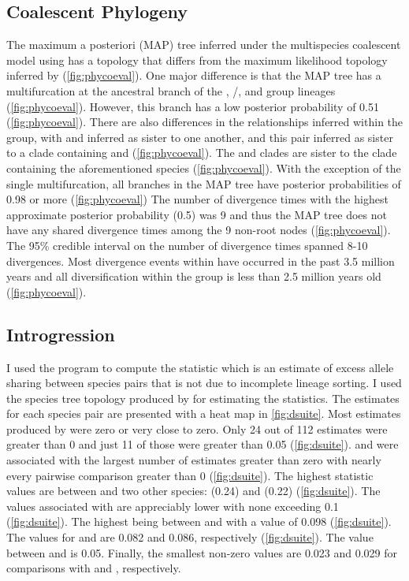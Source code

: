 \subsection{Coalescent Phylogeny}
The maximum a posteriori (MAP) tree inferred under the multispecies coalescent
model using \phycoeval has a topology that differs from the maximum likelihood topology 
inferred by \iqtree (\cref{fig:phycoeval}).
One major difference is that the \phycoeval MAP tree has a multifurcation at the ancestral
branch of the \quercicus, \speciosus/\cognatus, and \amer group lineages (\cref{fig:phycoeval}). 
However, this branch has a low posterior probability of 0.51 (\cref{fig:phycoeval}). 
There are also differences in the relationships inferred within the \amer group,
with \amer and \terr inferred as sister to one another, and this pair inferred as sister 
to a clade containing \wood and \terr (\cref{fig:phycoeval}).  
The \hemiophrys and \baxteri clades are sister to the clade containing the aforementioned
species (\cref{fig:phycoeval}).
With the exception of the single multifurcation, all branches in the MAP tree have 
posterior probabilities of 0.98 or more (\cref{fig:phycoeval})
The number of divergence times with the highest approximate posterior probability
(0.5) was 9 and thus the MAP tree does not have any shared divergence times among the 
9 non-root nodes (\cref{fig:phycoeval}). 
The 95\% credible interval on the number of divergence times spanned 8-10 divergences. 
Most divergence events within \anaxyrus have occurred in the past 3.5 million 
years and all diversification within the \americanus group is less than 2.5   
million years old (\cref{fig:phycoeval}).

\subsection{Introgression}
I used the program \dsuite to compute the \fbranch statistic which is an  
estimate of excess allele sharing between species pairs that is not due to 
incomplete lineage sorting. 
I used the species tree topology produced by \phycoeval for estimating 
the \fbranch statistics. 
The \fbranch estimates for each species pair are presented with a heat map in 
\cref{fig:dsuite}.
Most \fbranch estimates produced by \dsuite were zero or very close to zero.
Only 24 out of 112 \fbranch estimates were greater than 0 and just 11 of those were 
greater than 0.05 (\cref{fig:dsuite}).
\amer and \wood were associated with the largest number of estimates greater than
zero with nearly every pairwise comparison greater than 0
(\cref{fig:dsuite}). 
The highest \fbranch statistic values are between \amer and two other 
species: \hemiophrys (0.24) and \baxteri (0.22) (\cref{fig:dsuite}).
The values associated with \wood are appreciably lower with none exceeding 
0.1 (\cref{fig:dsuite}).
The highest being between \amer and \wood with a value of 0.098 (\cref{fig:dsuite}).
The \wood \fbranch values for \baxteri and \hemiophrys are 0.082 and 0.086, 
respectively (\cref{fig:dsuite}).
The \fbranch value between \wood and \microscaphus is 0.05.
Finally, the smallest non-zero \wood \fbranch values are 0.023 and 0.029 for comparisons 
with \cognatus and \speciosus, respectively.

